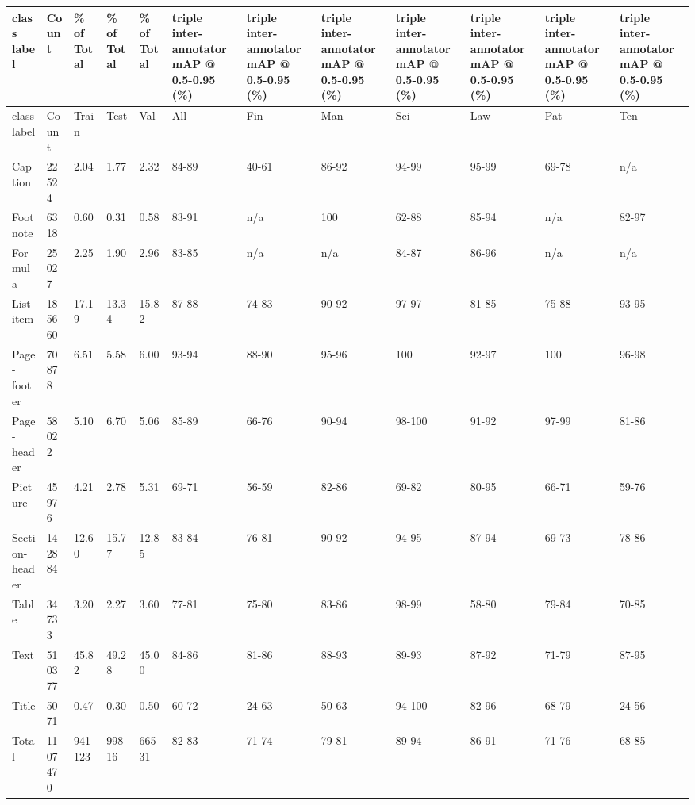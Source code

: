 \documentclass[11pt,a4paper]{article}
\begin{document}
\begin{table}[h]
\begin{tabular}{|l|l|l|l|l|l|l|l|l|l|l|l|}
\hline
class label & Count & \% of Total & \% of Total & \% of Total & triple inter-annotator mAP @ 0.5-0.95 (\%) & triple inter-annotator mAP @ 0.5-0.95 (\%) & triple inter-annotator mAP @ 0.5-0.95 (\%) & triple inter-annotator mAP @ 0.5-0.95 (\%) & triple inter-annotator mAP @ 0.5-0.95 (\%) & triple inter-annotator mAP @ 0.5-0.95 (\%) & triple inter-annotator mAP @ 0.5-0.95 (\%) \\ \hline
class label & Count & Train & Test & Val & All & Fin & Man & Sci & Law & Pat & Ten \\ \hline
Caption & 22524 & 2.04 & 1.77 & 2.32 & 84-89 & 40-61 & 86-92 & 94-99 & 95-99 & 69-78 & n/a \\ \hline
Footnote & 6318 & 0.60 & 0.31 & 0.58 & 83-91 & n/a & 100 & 62-88 & 85-94 & n/a & 82-97 \\ \hline
Formula & 25027 & 2.25 & 1.90 & 2.96 & 83-85 & n/a & n/a & 84-87 & 86-96 & n/a & n/a \\ \hline
List-item & 185660 & 17.19 & 13.34 & 15.82 & 87-88 & 74-83 & 90-92 & 97-97 & 81-85 & 75-88 & 93-95 \\ \hline
Page-footer & 70878 & 6.51 & 5.58 & 6.00 & 93-94 & 88-90 & 95-96 & 100 & 92-97 & 100 & 96-98 \\ \hline
Page-header & 58022 & 5.10 & 6.70 & 5.06 & 85-89 & 66-76 & 90-94 & 98-100 & 91-92 & 97-99 & 81-86 \\ \hline
Picture & 45976 & 4.21 & 2.78 & 5.31 & 69-71 & 56-59 & 82-86 & 69-82 & 80-95 & 66-71 & 59-76 \\ \hline
Section-header & 142884 & 12.60 & 15.77 & 12.85 & 83-84 & 76-81 & 90-92 & 94-95 & 87-94 & 69-73 & 78-86 \\ \hline
Table & 34733 & 3.20 & 2.27 & 3.60 & 77-81 & 75-80 & 83-86 & 98-99 & 58-80 & 79-84 & 70-85 \\ \hline
Text & 510377 & 45.82 & 49.28 & 45.00 & 84-86 & 81-86 & 88-93 & 89-93 & 87-92 & 71-79 & 87-95 \\ \hline
Title & 5071 & 0.47 & 0.30 & 0.50 & 60-72 & 24-63 & 50-63 & 94-100 & 82-96 & 68-79 & 24-56 \\ \hline
Total & 1107470 & 941123 & 99816 & 66531 & 82-83 & 71-74 & 79-81 & 89-94 & 86-91 & 71-76 & 68-85 \\ \hline
\end{tabular}
\end{table}

\begin{figure}[h]
\end{figure}
\end{document}
